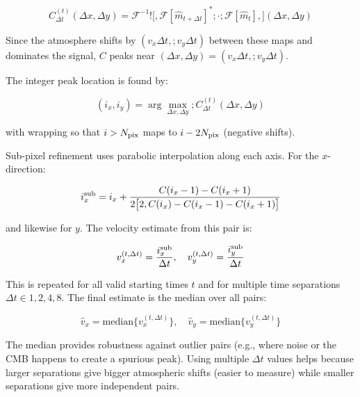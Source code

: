  $$C_{\Delta t}^{(t)}(\Delta x, \Delta y) = \mathcal{F}^{-1}!\Big[,\mathcal{F}[\hat{m}_{t+\Delta t}]^*  
  ;\cdot; \mathcal{F}[\hat{m}_t],\Big](\Delta x, \Delta y)$$   
                                                                                                         
  Since the atmosphere shifts by $(v_x \Delta t,; v_y \Delta t)$ between these maps and dominates the    
  signal, $C$ peaks near $(\Delta x, \Delta y) = (v_x \Delta t,; v_y \Delta t)$.
                                                                                                         
  The integer peak location is found by:                       

  $$(i_x, i_y) = \arg\max_{\Delta x, \Delta y} ; C_{\Delta t}^{(t)}(\Delta x, \Delta y)$$                
  
  with wrapping so that $i > N_{\rm pix}$ maps to $i - 2N_{\rm pix}$ (negative shifts).                  
                                                               
  Sub-pixel refinement uses parabolic interpolation along each axis. For the $x$-direction:              
                                                               
  $$i_x^{\rm sub} = i_x + \frac{C(i_x - 1) - C(i_x + 1)}{2\big[2,C(i_x) - C(i_x - 1) - C(i_x + 1)\big]}$$
                                                               
  and likewise for $y$. The velocity estimate from this pair is:                                         
                                                               
  $$v_x^{(t,\Delta t)} = \frac{i_x^{\rm sub}}{\Delta t}, \quad v_y^{(t,\Delta t)} = \frac{i_y^{\rm       
  sub}}{\Delta t}$$                                            
                                                                                                         
  This is repeated for all valid starting times $t$ and for multiple time separations $\Delta t \in {1,  
  2, 4, 8}$. The final estimate is the median over all pairs: 
                                                                                                         
  $$\hat{v}_x = \mathrm{median}\big\{
  v_x^{(t,\Delta t)}\big\}, \quad \hat{v}_y =                           
  \mathrm{median}\big\{v_y^{(t,\Delta t)}
  \big\}$$
                                                                                                         
  The median provides robustness against outlier pairs (e.g., where noise or the CMB happens to create a 
  spurious peak). Using multiple $\Delta t$ values helps because larger separations give bigger
  atmospheric shifts (easier to measure) while smaller separations give more independent pairs.          
                                    
